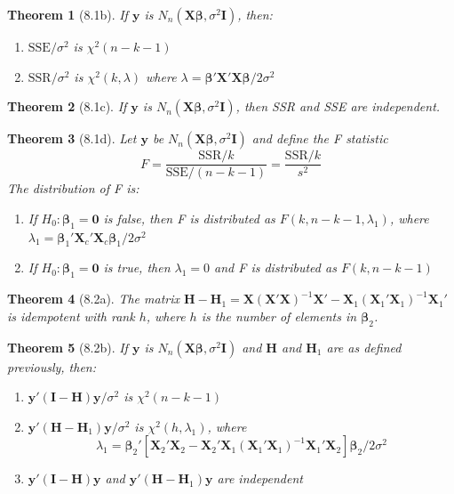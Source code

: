 \documentclass{article}
\newtheorem{theorem}{Theorem}[section]
\begin{document}
\begin{theorem}[8.1b]
If $\mathbf{y}$ is $N_n(\mathbf{X}\boldsymbol{\beta}, \sigma^2\mathbf{I})$, then:
\begin{enumerate}[label=(\roman*)]
\item $\text{SSE}/\sigma^2$ is $\chi^2(n-k-1)$
\item $\text{SSR}/\sigma^2$ is $\chi^2(k,\lambda)$ where $\lambda = \boldsymbol{\beta}'\mathbf{X}'\mathbf{X}\boldsymbol{\beta}/2\sigma^2$
\end{enumerate}
\end{theorem}

\begin{theorem}[8.1c]
If $\mathbf{y}$ is $N_n(\mathbf{X}\boldsymbol{\beta}, \sigma^2\mathbf{I})$, then SSR and SSE are independent.
\end{theorem}

\begin{theorem}[8.1d]
Let $\mathbf{y}$ be $N_n(\mathbf{X}\boldsymbol{\beta}, \sigma^2\mathbf{I})$ and define the F statistic
\[F = \frac{\text{SSR}/k}{\text{SSE}/(n-k-1)} = \frac{\text{SSR}/k}{s^2}\]
The distribution of F is:
\begin{enumerate}[label=(\roman*)]
\item If $H_0: \boldsymbol{\beta}_1 = \mathbf{0}$ is false, then F is distributed as $F(k,n-k-1,\lambda_1)$, where $\lambda_1 = \boldsymbol{\beta}_1'\mathbf{X}_c'\mathbf{X}_c\boldsymbol{\beta}_1/2\sigma^2$
\item If $H_0: \boldsymbol{\beta}_1 = \mathbf{0}$ is true, then $\lambda_1 = 0$ and F is distributed as $F(k,n-k-1)$
\end{enumerate}
\end{theorem}

\begin{theorem}[8.2a]
The matrix $\mathbf{H} - \mathbf{H}_1 = \mathbf{X}(\mathbf{X}'\mathbf{X})^{-1}\mathbf{X}' - \mathbf{X}_1(\mathbf{X}_1'\mathbf{X}_1)^{-1}\mathbf{X}_1'$ is idempotent with rank $h$, where $h$ is the number of elements in $\boldsymbol{\beta}_2$.
\end{theorem}

\begin{theorem}[8.2b]
If $\mathbf{y}$ is $N_n(\mathbf{X}\boldsymbol{\beta}, \sigma^2\mathbf{I})$ and $\mathbf{H}$ and $\mathbf{H}_1$ are as defined previously, then:
\begin{enumerate}[label=(\roman*)]
\item $\mathbf{y}'(\mathbf{I}-\mathbf{H})\mathbf{y}/\sigma^2$ is $\chi^2(n-k-1)$
\item $\mathbf{y}'(\mathbf{H}-\mathbf{H}_1)\mathbf{y}/\sigma^2$ is $\chi^2(h,\lambda_1)$, where 
\[\lambda_1 = \boldsymbol{\beta}_2'[\mathbf{X}_2'\mathbf{X}_2 - \mathbf{X}_2'\mathbf{X}_1(\mathbf{X}_1'\mathbf{X}_1)^{-1}\mathbf{X}_1'\mathbf{X}_2]\boldsymbol{\beta}_2/2\sigma^2\]
\item $\mathbf{y}'(\mathbf{I} - \mathbf{H})\mathbf{y}$ and $\mathbf{y}'(\mathbf{H} - \mathbf{H}_1)\mathbf{y}$ are independent
\end{enumerate}
\end{theorem}
\end{document}
